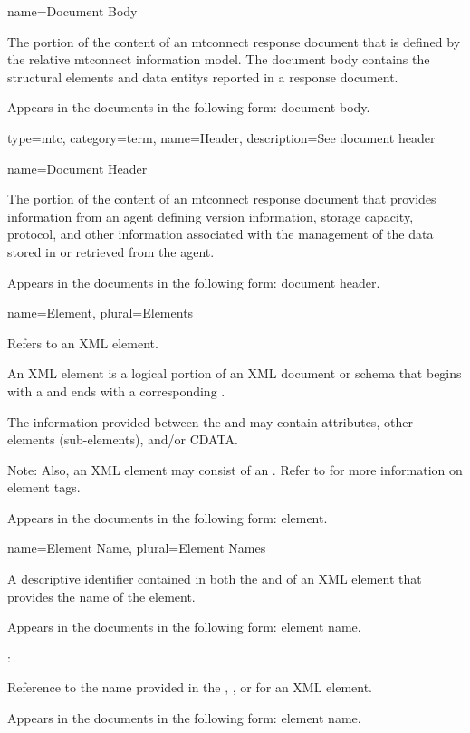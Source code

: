 {
  name={Document Body}
}
{
	The portion of the content of an \gls{mtconnect response document} that is defined by the relative \gls{mtconnect information model}. The \gls{document body} contains the \glspl{structural element} and \glspl{data entity} reported in a \gls{response document}.

	Appears in the documents in the following form: \gls{document body}.
}

{
  type=mtc,
  category=term,
  name={Header},
  description={See \gls{document header}}
}


{
  name={Document Header}
}
{
	The portion of the content of an \gls{mtconnect response document} that provides information from an \gls{agent} defining version information, storage capacity, protocol, and other information associated with the management of the data stored in or retrieved from the \gls{agent}.
	
	Appears in the documents in the following form: \gls{document header}.
}


{
  name={Element},
  plural={Elements}
}
{
	Refers to an XML element.

	An XML element is a logical portion of an XML document or schema that begins with a  and ends with a corresponding .  

	The information provided between the  and  may contain attributes, other elements (sub-elements), and/or CDATA.

    \begin{note}
	Note:  Also, an XML element may consist of an .  Refer to  for more information on element tags.
    \end{note}
    
	Appears in the documents in the following form: element.
}


{
  name={Element Name},
  plural={Element Names}
}
{
	A descriptive identifier contained in both the  and  of an XML element that provides the name of the element.

	Appears in the documents in the following form: element name.

	:

	Reference to the name provided in the , , or  for an XML element.

	Appears in the documents in the following form: \gls{element name}.
}


